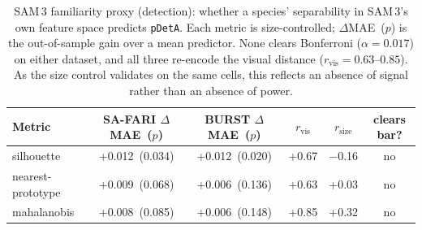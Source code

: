 \begin{table}[htbp]\centering
  \caption[SAM\,3 familiarity proxy]{SAM\,3 familiarity proxy (detection): whether a species' separability in SAM\,3's own
  feature space predicts \texttt{pDetA}. Each metric is size-controlled; $\Delta$MAE~($p$) is the out-of-sample gain over
  a mean predictor. None clears Bonferroni ($\alpha=0.017$) on either dataset, and all three re-encode the
  visual distance ($r_\text{vis}=0.63$--$0.85$). As the size control validates on the same cells, this reflects
  an absence of signal rather than an absence of power.}
  \label{tab:familiarity}
  \begin{tabular}{lccccc}
    \toprule
    Metric & SA-FARI $\Delta$MAE~($p$) & BURST $\Delta$MAE~($p$) & $r_\text{vis}$ & $r_\text{size}$ & clears bar? \\
    \midrule
    silhouette        & +0.012~(0.034) & +0.012~(0.020) & +0.67 & $-$0.16 & no \\
    nearest-prototype & +0.009~(0.068) & +0.006~(0.136) & +0.63 & +0.03 & no \\
    mahalanobis       & +0.008~(0.085) & +0.006~(0.148) & +0.85 & +0.32 & no \\
    \bottomrule
  \end{tabular}
\end{table}
